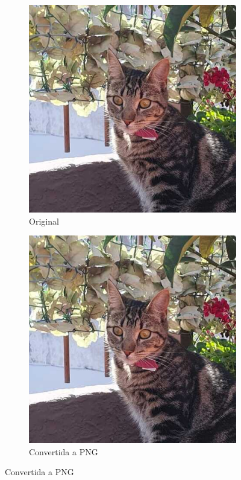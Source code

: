 \documentclass[11pt]{article}
\begin{document}
\begin{figure}[h]
    \centering
    \begin{subfigure}[b]{0.3\textwidth}
        \centering
        \includegraphics[width=\textwidth]{resources/distributed_systems/pipeline_images/input.jpg}
        \caption{Original}
    \end{subfigure}
    \hspace{10mm}
    \begin{subfigure}[b]{0.3\textwidth}
        \centering
        \includegraphics[width=\textwidth]{resources/distributed_systems/pipeline_images/formatted.png}
        \caption{Convertida a PNG}
    \end{subfigure}
    

\end{figure}
\end{document}
